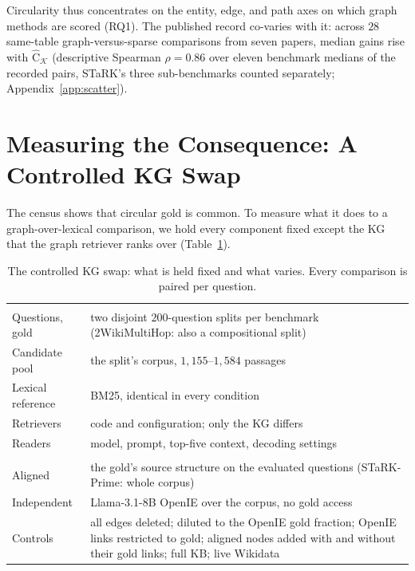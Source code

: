 \documentclass[11pt]{article}
\newcommand{\Chat}{\widehat{\mathrm{C}}}
\newcommand{\kg}{\mathcal{K}}
\begin{document}
Circularity thus concentrates on the entity, edge, and path axes on which graph methods are scored (RQ1). The published record co-varies with it: across $28$ same-table graph-versus-sparse comparisons from seven papers, median gains rise with $\Chat_{\kg}$ (descriptive Spearman $\rho=0.86$ over eleven benchmark medians of the recorded pairs, STaRK's three sub-benchmarks counted separately; Appendix~\ref{app:scatter}).

\section{Measuring the Consequence: A Controlled KG Swap}
\label{sec:setup}
The census shows that circular gold is common. To measure what it does to a graph-over-lexical comparison, we hold every component fixed except the KG that the graph retriever ranks over (Table~\ref{tab:protocol}).

\begin{table}[t]\centering\footnotesize
\setlength{\tabcolsep}{3pt}
\begin{tabular}{>{\raggedright\arraybackslash}p{}>{\raggedright\arraybackslash}p{}}
\toprule
\multicolumn{2}{l}{\textit{Held fixed across the two arms}}\\
Questions, gold & two disjoint $200$-question splits per benchmark (2WikiMultiHop: also a compositional split)\\
Candidate pool & the split's corpus, $1{,}155$--$1{,}584$ passages\\
Lexical reference & BM25, identical in every condition\\
Retrievers & code and configuration; only the KG differs\\
Readers & model, prompt, top-five context, decoding settings\\
\midrule
\multicolumn{2}{l}{\textit{Varied: the KG the graph retriever ranks over}}\\
Aligned & the gold's source structure on the evaluated questions (STaRK-Prime: whole corpus)\\
Independent & Llama-3.1-8B OpenIE over the corpus, no gold access\\
Controls & all edges deleted; diluted to the OpenIE gold fraction; OpenIE links restricted to gold; aligned nodes added with and without their gold links; full KB; live Wikidata\\
\bottomrule
\end{tabular}
\caption{The controlled KG swap: what is held fixed and what varies. Every comparison is paired per question.}
\label{tab:protocol}
\end{table}
\end{document}
